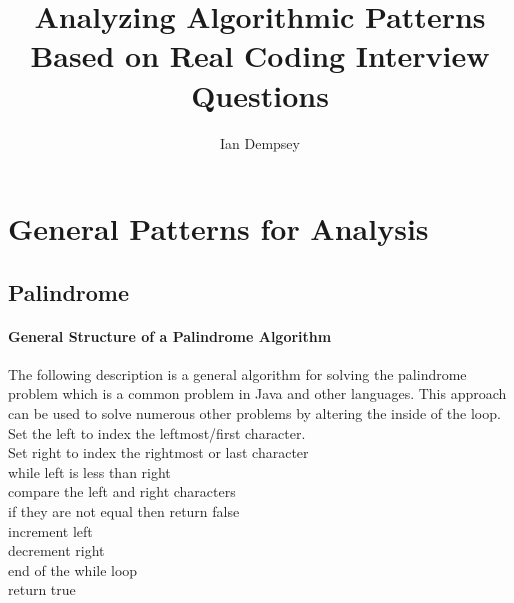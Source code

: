 \documentclass[twocolumn]{article}
\title{Analyzing Algorithmic Patterns Based on Real Coding Interview Questions}
\author{Ian Dempsey}
\begin{document}
\maketitle
{}

\newpage
{}

\section{General Patterns for Analysis}
\subsection{Palindrome}
\paragraph{General Structure of a Palindrome Algorithm}
The following description is a general algorithm for solving the palindrome problem which is a common problem in Java and other languages. This approach can be used to solve numerous other problems by altering the inside of the loop.
Set the left to index the leftmost/first character.\\
Set right to index the rightmost or last character\\
while left is less than right\\
\hspace*{0.5in}	compare the left and right characters\\
\hspace*{0.5in}	if they are not equal then return false\\
\hspace*{0.5in}	increment left\\
\hspace*{0.5in}	decrement right\\
end of the while loop\\
return true 
\end{document}
